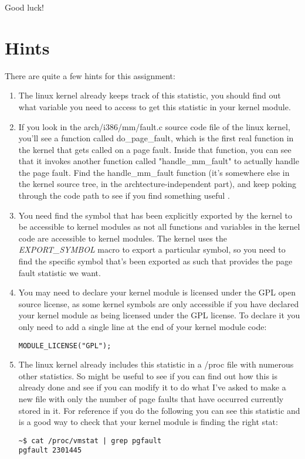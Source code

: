 \documentclass[11pt]{article}
\begin{document}
Good luck!

\section*{Hints}

There are quite a few hints for this assignment:

\begin{enumerate}
\item The linux kernel already keeps track of this statistic, you should find out what variable you need to access to get this statistic in your kernel module.
\item If you look in the arch/i386/mm/fault.c source code file of the linux kernel, you'll see a function called do\_page\_fault, which is the first real function in the kernel that gets called on a page fault. Inside that function, you can see that it invokes another function called "handle\_mm\_fault" to actually handle the page fault. Find the handle\_mm\_fault function (it's somewhere else in the kernel source tree, in the archtecture-independent part), and keep poking through the code path to see if you find something useful \cite{cse551}.
\item You need find the symbol that has been explicitly exported by the kernel to be accessible to kernel modules as not all functions and variables in the kernel code are accessible to kernel modules. The kernel uses the \emph{EXPORT\_SYMBOL} macro to export a particular symbol, so you need to find the specific symbol that's been exported as such that provides the page fault statistic we want.
\item You may need to declare your kernel module is licensed under the GPL open source license, as some kernel symbols are only accessible if you have declared your kernel module as being licensed under the GPL license. To declare it you only need to add a single line at the end of your kernel module code\cite{gpl}:

\begin{verbatim}
MODULE_LICENSE("GPL");
\end{verbatim}

\item The linux kernel already includes this statistic in a /proc file with numerous other statistics. So might be useful to see if you can find out how this is already done and see if you can modify it to do what I've asked to make a new file with only the number of page faults that have occurred currently stored in it. For reference if you do the following you can see this statistic and is a good way to check that your kernel module is finding the right stat:

\begin{verbatim}
~$ cat /proc/vmstat | grep pgfault
pgfault 2301445
\end{verbatim}
\end{enumerate}
\end{document}
